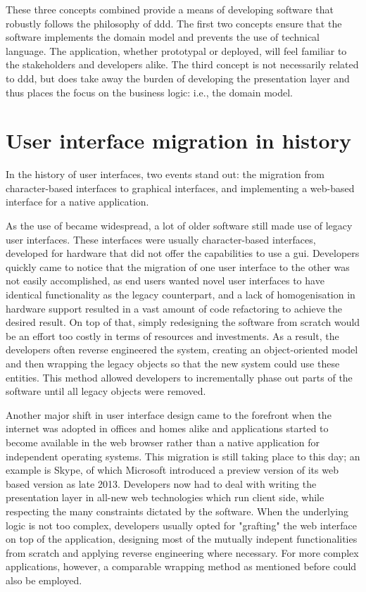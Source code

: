 These three concepts combined provide a means of developing software that robustly follows the philosophy of \acrshort{ddd}. The first two concepts ensure that the software implements the domain model and prevents the use of technical language. The application, whether prototypal or deployed, will feel familiar to the stakeholders and developers alike. The third concept is not necessarily related to \acrshort{ddd}, but does take away the burden of developing the presentation layer and thus places the focus on the business logic: i.e., the domain model.

\section{User interface migration in history}
\label{section:userinterfacemigrationinhistory}
In the history of user interfaces, two events stand out: the migration from character-based interfaces to graphical interfaces, and implementing a web-based interface for a native application.

As the use of  became widespread, a lot of older software still made use of legacy user interfaces. These interfaces were usually character-based interfaces, developed for hardware that did not offer the capabilities to use a \acrshort{gui}\cite{merlo1995reengineering}. Developers quickly came to notice that the migration of one user interface to the other was not easily accomplished, as end users wanted novel user interfaces to have identical functionality as the legacy counterpart, and a lack of homogenisation in hardware support resulted in a vast amount of code refactoring to achieve the desired result\cite{moore1994knowledge}. On top of that, simply redesigning the software from scratch would be an effort too costly in terms of resources and investments. As a result, the developers often reverse engineered the system, creating an object-oriented model and then wrapping the legacy objects so that the new system could use these entities\cite{de1997migrating}. This method allowed developers to incrementally phase out parts of the software until all legacy objects were removed.

Another major shift in user interface design came to the forefront when the internet was adopted in offices and homes alike and applications started to become available in the web browser rather than a native application for independent operating systems. This migration is still taking place to this day; an example is Skype, of which Microsoft introduced a preview version of its web based version as late 2013\cite{TypeL20:online}. Developers now had to deal with writing the presentation layer in all-new web technologies which run client side, while respecting the many constraints dictated by the software. When the underlying logic is not too complex, developers usually opted for "grafting" the web interface on top of the application, designing most of the mutually indepent functionalities from scratch and applying reverse engineering where necessary. For more complex applications, however, a comparable wrapping method as mentioned before could also be employed\cite{aversano2001migrating}.

